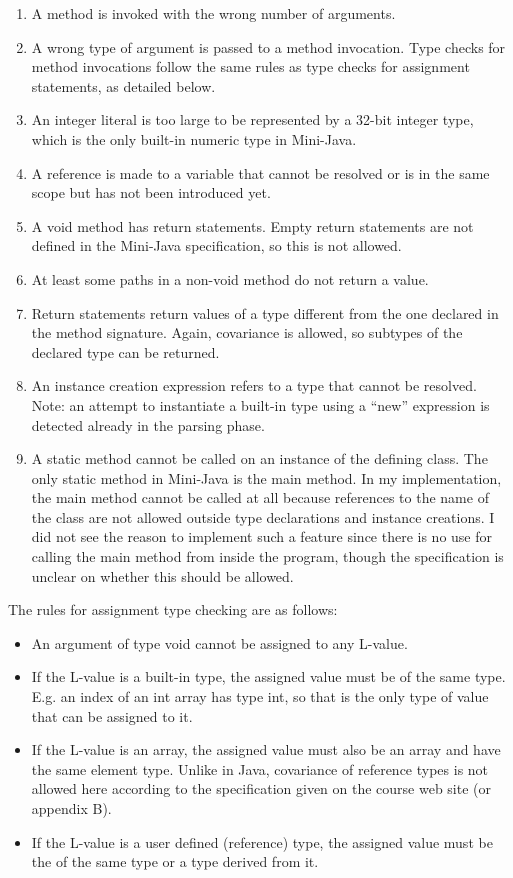 \documentclass[a4paper,11pt]{article}
\begin{document}
\begin{enumerate}
\item A method is invoked with the wrong number of arguments.
\item A wrong type of argument is passed to a method invocation. Type checks for method invocations follow the same rules as type checks for assignment statements, as detailed below.
\item An integer literal is too large to be represented by a 32-bit integer type, which is the only built-in numeric type in Mini-Java.
\item A reference is made to a variable that cannot be resolved or is in the same scope but has not been introduced yet.
\item A void method has return statements. Empty return statements are not defined in the Mini-Java specification, so this is not allowed.
\item At least some paths in a non-void method do not return a value.
\item Return statements return values of a type different from the one declared in the method signature. Again, covariance is allowed, so subtypes of the declared type can be returned.
\item An instance creation expression refers to a type that cannot be resolved. Note: an attempt to instantiate a built-in type using a ``new'' expression is detected already in the parsing phase.
\item A static method cannot be called on an instance of the defining class. The only static method in Mini-Java is the main method. In my implementation, the main method cannot be called at all because references to the name of the class are not allowed outside type declarations and instance creations. I did not see the reason to implement such a feature since there is no use for calling the main method from inside the program, though the specification is unclear on whether this should be allowed.
\end{enumerate}

The rules for assignment type checking are as follows:
\begin{itemize}
\item An argument of type void cannot be assigned to any L-value.
\item If the L-value is a built-in type, the assigned value must be of the same type. E.g. an index of an int array has type int, so that is the only type of value that can be assigned to it.
\item If the L-value is an array, the assigned value must also be an array and have the same element type. Unlike in Java, covariance of reference types is not allowed here according to the specification given on the course web site (or appendix B).
\item If the L-value is a user defined (reference) type, the assigned value must be the of the same type or a type derived from it.
\end{itemize}
\end{document}
